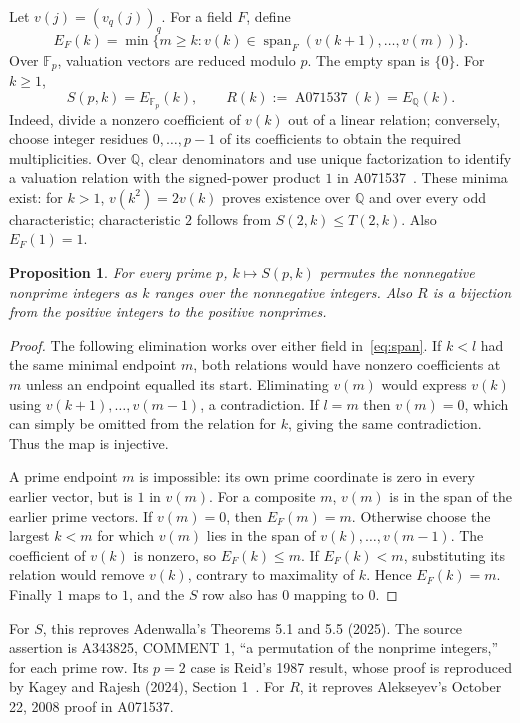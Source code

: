 \documentclass[11pt]{article}
\newtheorem{proposition}[theorem]{Proposition}
\begin{document}
Let $v(j)=(v_q(j))_q$. For a field $F$, define
\[
 E_F(k)=\min\{m\ge k: v(k)\in
 \operatorname{span}_F(v(k+1),\ldots,v(m))\}.
\]
Over $\mathbb F_p$, valuation vectors are reduced modulo $p$.
The empty span is $\{0\}$. For $k\ge1$,
\begin{equation}\label{eq:span}
 S(p,k)=E_{\mathbb F_p}(k),\qquad
 R(k):=\operatorname{A071537}(k)=E_{\mathbb Q}(k).
\end{equation}
Indeed, divide a nonzero coefficient of $v(k)$ out of a linear relation;
conversely, choose integer residues $0,\ldots,p-1$ of its coefficients
to obtain the required multiplicities. Over $\mathbb Q$, clear
denominators and use unique factorization to identify a valuation relation
with the signed-power product $1$ in A071537~\cite{a071537}.
These minima exist: for $k>1$, $v(k^2)=2v(k)$ proves existence over
$\mathbb Q$ and over every odd characteristic; characteristic $2$ follows
from $S(2,k)\le T(2,k)$. Also $E_F(1)=1$.

\begin{proposition}\label{prop:permutation}
For every prime $p$, $k\mapsto S(p,k)$ permutes the nonnegative
nonprime integers as $k$ ranges over the nonnegative integers.
Also $R$ is a bijection from the positive integers to the positive nonprimes.
\end{proposition}
\begin{proof}
The following elimination works over either field in~\eqref{eq:span}.
If $k<l$ had the same minimal endpoint $m$, both relations would have
nonzero coefficients at $m$ unless an endpoint equalled its start.
Eliminating $v(m)$ would express $v(k)$ using $v(k+1),\ldots,v(m-1)$,
a contradiction. If $l=m$ then $v(m)=0$, which can simply be omitted
from the relation for $k$, giving the same contradiction.
Thus the map is injective.

A prime endpoint $m$ is impossible: its own prime coordinate is zero
in every earlier vector, but is $1$ in $v(m)$.
For a composite $m$, $v(m)$ is in the span of the earlier prime vectors.
If $v(m)=0$, then $E_F(m)=m$. Otherwise choose the largest $k<m$ for
which $v(m)$ lies in the span of $v(k),\ldots,v(m-1)$.
The coefficient of $v(k)$ is nonzero, so $E_F(k)\le m$.
If $E_F(k)<m$, substituting its relation would remove $v(k)$, contrary
to maximality of $k$. Hence $E_F(k)=m$.
Finally $1$ maps to $1$, and the $S$ row also has $0$ mapping to $0$.
\end{proof}
For $S$, this reproves Adenwalla's Theorems 5.1 and 5.5 (2025).
The source assertion is A343825, COMMENT 1, ``a permutation of the
nonprime integers,'' for each prime row.
Its $p=2$ case is Reid's 1987 result, whose proof is reproduced by
Kagey and Rajesh (2024), Section 1~\cite{kageyrajesh}.
For $R$, it reproves Alekseyev's October 22, 2008 proof in A071537.
\end{document}
